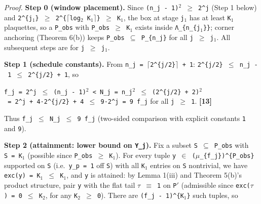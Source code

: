 \documentclass[
  american,
  11pt,
  letterpaper,
]{article}
\begin{document}
\emph{Proof.} \textbf{Step 0 (window placement).} Since \texttt{(n\_j\ -\ 1)\ensuremath{{}^{2}}\ \ensuremath{\geq}\ 2\^{}j} (Step 1 below) and \texttt{2\^{}\{j\ensuremath{{}_{1}}\}\ \ensuremath{\geq}\ 2\^{}\{\ensuremath{\lceil}log\ensuremath{{}_{2}}\ K\ensuremath{{}_{1}}\ensuremath{\rceil}\}\ \ensuremath{\geq}\ K\ensuremath{{}_{1}}}, the box at stage \texttt{j\ensuremath{{}_{1}}} has at least \texttt{K\ensuremath{{}_{1}}} plaquettes, so a \texttt{P\_obs} with \texttt{\textbar{}P\_obs\textbar{}\ \ensuremath{\geq}\ K\ensuremath{{}_{1}}} exists inside \texttt{Λ\_\{n\_\{j\ensuremath{{}_{1}}\}\}}; corner anchoring (Theorem 6(b)) keeps \texttt{P\_obs\ \ensuremath{\subseteq}\ P\_\{n\_j\}} for all \texttt{j\ \ensuremath{\geq}\ j\ensuremath{{}_{1}}}. All subsequent steps are for \texttt{j\ \ensuremath{\geq}\ j\ensuremath{{}_{1}}}.

\textbf{Step 1 (schedule constants).} From \texttt{n\_j\ =\ \ensuremath{\lceil}2\^{}\{j/2\}\ensuremath{\rceil}\ +\ 1}: \texttt{2\^{}\{j/2\}\ \ensuremath{\leq}\ n\_j\ -\ 1\ \ensuremath{\leq}\ 2\^{}\{j/2\}\ +\ 1}, so

\texttt{f\_j\ =\ 2\^{}j\ \ensuremath{\leq}\ (n\_j\ -\ 1)\ensuremath{{}^{2}}\ \textless{}\ N\_j\ =\ n\_j\ensuremath{{}^{2}}\ \ensuremath{\leq}\ (2\^{}\{j/2\}\ +\ 2)\ensuremath{{}^{2}}\ =\ 2\^{}j\ +\ 4·2\^{}\{j/2\}\ +\ 4\ \ensuremath{\leq}\ 9·2\^{}j\ =\ 9\ f\_j} for all \texttt{j\ \ensuremath{\geq}\ 1}. \textbf{{[}13{]}}

Thus \texttt{f\_j\ \ensuremath{\leq}\ N\_j\ \ensuremath{\leq}\ 9\ f\_j} (two-sided comparison with explicit constants \texttt{1} and \texttt{9}).

\textbf{Step 2 (attainment: lower bound on \texttt{\textbar{}Y\_j\textbar{}}).} Fix a subset \texttt{S\ \ensuremath{\subseteq}\ P\_obs} with \texttt{\textbar{}S\textbar{}\ =\ K\ensuremath{{}_{1}}} (possible since \texttt{\textbar{}P\_obs\textbar{}\ \ensuremath{\geq}\ K\ensuremath{{}_{1}}}). For every tuple \texttt{y\ \ensuremath{\in}\ (\ensuremath{\mu}\_\{f\_j\})\^{}\{P\_obs\}} supported on \texttt{S} (i.e.~\texttt{y\_p\ =\ 1} off \texttt{S}) with all \texttt{K\ensuremath{{}_{1}}} entries on \texttt{S} nontrivial, we have \texttt{exc(y)\ =\ K\ensuremath{{}_{1}}\ \ensuremath{\leq}\ K\ensuremath{{}_{1}}}, and \texttt{y} is attained: by Lemma 1(iii) and Theorem 5(b)'s product structure, pair \texttt{y} with the flat tail \texttt{\ensuremath{\tau}\ \ensuremath{\equiv}\ 1} on \texttt{P\ensuremath{'}} (admissible since \texttt{exc(\ensuremath{\tau})\ =\ 0\ \ensuremath{\leq}\ K\ensuremath{{}_{2}}}, for any \texttt{K\ensuremath{{}_{2}}\ \ensuremath{\geq}\ 0}). There are \texttt{(f\_j\ -\ 1)\^{}\{K\ensuremath{{}_{1}}\}} such tuples, so
\end{document}
